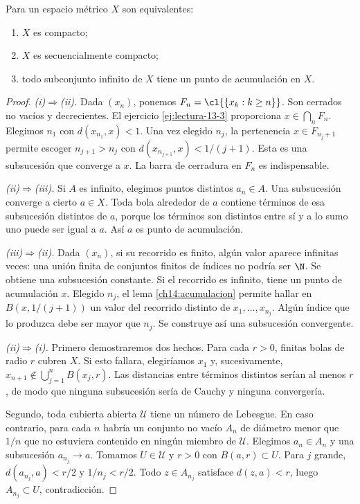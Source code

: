 \begin{teorema}\label{ch14:equivalencias}
Para un espacio métrico $X$ son equivalentes:
\begin{enumerate}[label=(\roman*)]
\item $X$ es compacto;
\item $X$ es secuencialmente compacto;
\item todo subconjunto infinito de $X$ tiene un punto de acumulación en $X$.
\end{enumerate}
\end{teorema}
\begin{proof}
\emph{(i)$\Rightarrow$(ii).} Dada $(x_n)$, ponemos $F_n=\cl{\{x_k:k\ge n\}}$. Son cerrados no vacíos y decrecientes. El ejercicio \ref{ej:lectura-13-3} proporciona $x\in\bigcap_nF_n$. Elegimos $n_1$ con $d(x_{n_1},x)<1$. Una vez elegido $n_j$, la pertenencia $x\in F_{n_j+1}$ permite escoger $n_{j+1}>n_j$ con $d(x_{n_{j+1}},x)<1/(j+1)$. Esta es una subsucesión que converge a $x$. La barra de cerradura en $F_n$ es indispensable.

\emph{(ii)$\Rightarrow$(iii).} Si $A$ es infinito, elegimos puntos distintos $a_n\in A$. Una subsucesión converge a cierto $a\in X$. Toda bola alrededor de $a$ contiene términos de esa subsucesión distintos de $a$, porque los términos son distintos entre sí y a lo sumo uno puede ser igual a $a$. Así $a$ es punto de acumulación.

\emph{(iii)$\Rightarrow$(ii).} Dada $(x_n)$, si su recorrido es finito, algún valor aparece infinitas veces: una unión finita de conjuntos finitos de índices no podría ser $\N$. Se obtiene una subsucesión constante. Si el recorrido es infinito, tiene un punto de acumulación $x$. Elegido $n_j$, el lema \ref{ch14:acumulacion} permite hallar en $B(x,1/(j+1))$ un valor del recorrido distinto de $x_1,\ldots,x_{n_j}$. Algún índice que lo produzca debe ser mayor que $n_j$. Se construye así una subsucesión convergente.

\emph{(ii)$\Rightarrow$(i).} Primero demostraremos dos hechos. Para cada $r>0$, finitas bolas de radio $r$ cubren $X$. Si esto fallara, elegiríamos $x_1$ y, sucesivamente, $x_{n+1}\notin\bigcup_{j=1}^nB(x_j,r)$. Las distancias entre términos distintos serían al menos $r$, de modo que ninguna subsucesión sería de Cauchy y ninguna convergería.

Segundo, toda cubierta abierta $\mathcal U$ tiene un número de Lebesgue. En caso contrario, para cada $n$ habría un conjunto no vacío $A_n$ de diámetro menor que $1/n$ que no estuviera contenido en ningún miembro de $\mathcal U$. Elegimos $a_n\in A_n$ y una subsucesión $a_{n_j}\to a$. Tomamos $U\in\mathcal U$ y $r>0$ con $B(a,r)\subset U$. Para $j$ grande, $d(a_{n_j},a)<r/2$ y $1/n_j<r/2$. Todo $z\in A_{n_j}$ satisface $d(z,a)<r$, luego $A_{n_j}\subset U$, contradicción.


\end{proof}
